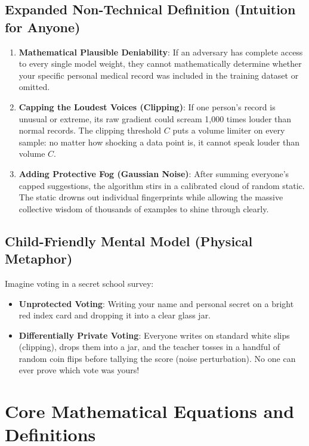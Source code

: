 \documentclass[11pt,a4paper]{article}
\theoremstyle{definition}
\begin{document}
\subsection{Expanded Non-Technical Definition (Intuition for Anyone)}
\begin{enumerate}
    \item \textbf{Mathematical Plausible Deniability}: If an adversary has complete access to every single model weight, they cannot mathematically determine whether your specific personal medical record was included in the training dataset or omitted.
    \item \textbf{Capping the Loudest Voices (Clipping)}: If one person's record is unusual or extreme, its raw gradient could scream 1,000 times louder than normal records. The clipping threshold $C$ puts a volume limiter on every sample: no matter how shocking a data point is, it cannot speak louder than volume $C$.
    \item \textbf{Adding Protective Fog (Gaussian Noise)}: After summing everyone's capped suggestions, the algorithm stirs in a calibrated cloud of random static. The static drowns out individual fingerprints while allowing the massive collective wisdom of thousands of examples to shine through clearly.
\end{enumerate}

\subsection{Child-Friendly Mental Model (Physical Metaphor)}
Imagine voting in a secret school survey:
\begin{itemize}
    \item \textbf{Unprotected Voting}: Writing your name and personal secret on a bright red index card and dropping it into a clear glass jar.
    \item \textbf{Differentially Private Voting}: Everyone writes on standard white slips (clipping), drops them into a jar, and the teacher tosses in a handful of random coin flips before tallying the score (noise perturbation). No one can ever prove which vote was yours!
\end{itemize}

\section{Core Mathematical Equations and Definitions}
\end{document}
